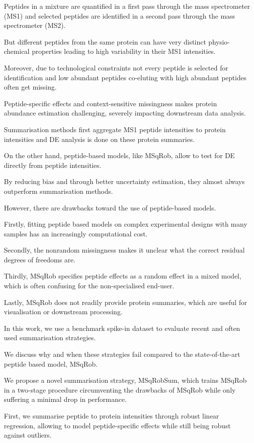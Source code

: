{Peptides in a mixture are quantified in a first pass through the mass spectrometer (MS1) and selected peptides are identified in a second pass through the mass spectrometer (MS2).

But different peptides from the same protein can have very distinct physio-chemical properties leading to high variability in their MS1 intensities.

Moreover, due to technological constraints not every peptide is selected for identification and low abundant peptides co-eluting with high abundant peptides often get missing.

Peptide-specific effects and context-sensitive missingness makes protein abundance estimation challenging, severely impacting downstream data analysis.

Summarisation methods first aggregate MS1 peptide intensities to protein intensities and DE analysis is done on these protein summaries.

On the other hand, peptide-based models, like MSqRob, allow to test for DE directly from peptide intensities.

By reducing bias and through better uncertainty estimation, they almost always outperform summarisation methods.

However, there are drawbacks toward the use of peptide-based models.

Firstly, fitting peptide based models on complex experimental designs with many samples has an increasingly computational cost.

Secondly, the nonrandom missingness makes it unclear what the correct residual degrees of freedoms are.

Thirdly, MSqRob specifies peptide effects as a random effect in a mixed model, which is often confusing for the non-specialised end-user.

Lastly, MSqRob does not readily provide protein summaries, which are useful for visualisation or downstream processing.

In this work, we use a benchmark spike-in dataset to evaluate recent and often used summarisation strategies.

We discuss why and when these strategies fail compared to the state-of-the-art peptide based model, MSqRob.

We propose a novel summarisation strategy, MSqRobSum, which trains MSqRob in a two-stage procedure circumventing the drawbacks of MSqRob while only suffering a minimal drop in performance.

First, we summarise peptide to protein intensities through robust linear regression, allowing to model peptide-specific effects while still being robust against outliers.

}
